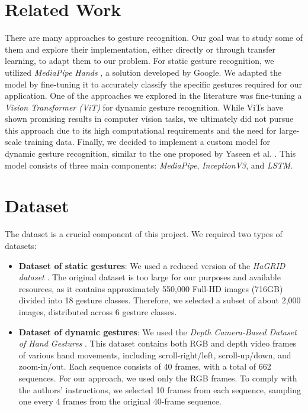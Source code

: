 \documentclass[10pt,twocolumn,letterpaper]{article}
\begin{document}
\section{Related Work}
There are many approaches to gesture recognition. Our goal was to study some of them and explore their implementation, either directly or through transfer learning, to adapt them to our problem.  
For static gesture recognition, we utilized \textit{MediaPipe Hands} \cite{zhang2020mediapipehandsondevicerealtime}, a solution developed by Google. We adapted the model by fine-tuning it to accurately classify the specific gestures required for our application.  
One of the approaches we explored in the literature was fine-tuning a \textit{Vision Transformer (ViT)} for dynamic gesture recognition. While ViTs have shown promising results in computer vision tasks, we ultimately did not pursue this approach due to its high computational requirements and the need for large-scale training data.  
Finally, we decided to implement a custom model for dynamic gesture recognition, similar to the one proposed by Yaseen et al. \cite{electronics13163233}. This model consists of three main components: \textit{MediaPipe}, \textit{InceptionV3}, and \textit{LSTM}.  

\section{Dataset}  
The dataset is a crucial component of this project. We required two types of datasets:  

\begin{itemize}  
   \item \textbf{Dataset of static gestures}: We used a reduced version of the \textit{HaGRID dataset} \cite{Alexander_2024}.  
   The original dataset is too large for our purposes and available resources, as it contains approximately 550,000 Full-HD images (716GB) divided into 18 gesture classes.  
   Therefore, we selected a subset of about 2,000 images, distributed across 6 gesture classes.  

   \item \textbf{Dataset of dynamic gestures}: We used the \textit{Depth Camera-Based Dataset of Hand Gestures} \cite{JEERU2022108659}.  
   This dataset contains both RGB and depth video frames of various hand movements, including scroll-right/left, scroll-up/down, and zoom-in/out. Each sequence consists of 40 frames, with a total of 662 sequences.  
   For our approach, we used only the RGB frames. To comply with the authors’ instructions, we selected 10 frames from each sequence, sampling one every 4 frames from the original 40-frame sequence.  
\end{itemize}  
\end{document}
